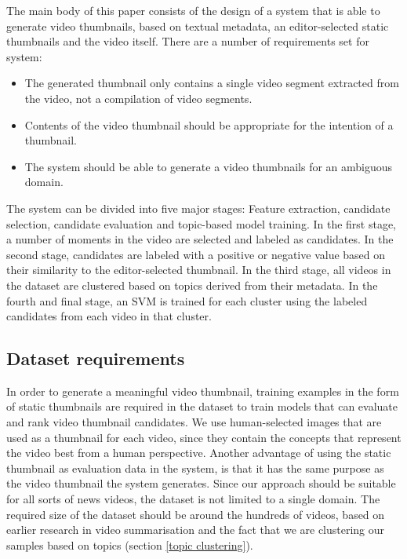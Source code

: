 \documentclass{../resources/sig-alternate-05-2015}
\begin{document}
The main body of this paper consists of the design of a system that is able to generate video thumbnails, based on textual metadata, an editor-selected static thumbnails and the video itself. There are a number of requirements set for system:

\begin{itemize}
	\item The generated thumbnail only contains a single video segment extracted from the video, not a compilation of video segments.
	\item Contents of the video thumbnail should be appropriate for the intention of a thumbnail.
	\item The system should be able to generate a video thumbnails for an ambiguous domain.
\end{itemize}

The system can be divided into five major stages: Feature extraction, candidate selection, candidate evaluation and topic-based model training. In the first stage, a number of moments in the video are selected and labeled as candidates. In the second stage, candidates are labeled with a positive or negative value based on their similarity to the editor-selected thumbnail. In the third stage, all videos in the dataset are clustered based on topics derived from their metadata. In the fourth and final stage, an SVM is trained for each cluster using the labeled candidates from each video in that cluster.

\subsection{Dataset requirements}
\label{dataset requirements}
In order to generate a meaningful video thumbnail, training examples in the form of static thumbnails are required in the dataset to train models that can evaluate and rank video thumbnail candidates. We use human-selected images that are used as a thumbnail for each video, since they contain the concepts that represent the video best from a human perspective. Another advantage of using the static thumbnail as evaluation data in the system, is that it has the same purpose as the video thumbnail the system generates. Since our approach should be suitable for all sorts of news videos, the dataset is not limited to a single domain. The required size of the dataset should be around the hundreds of videos, based on earlier research in video summarisation \cite{Almeida:2012be,Christel:2004in,Money:2008fn} and the fact that we are clustering our samples based on topics (section \ref{topic clustering}).
\end{document}
